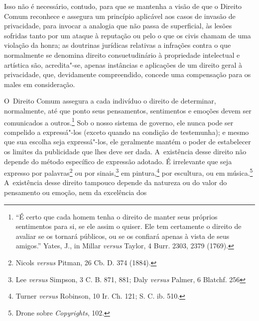 Isso não é necessário, contudo, para que se mantenha a visão de que o
Direito Comum reconhece e assegura um princípio aplicável aos casos de
invasão de privacidade, para invocar a analogia que não passa de
superficial, às lesões sofridas tanto por um ataque à reputação ou pelo
o que os civis chamam de uma violação da honra; as doutrinas jurídicas
relativas a infrações contra o que normalmente se denomina direito
consuetudinário à propriedade intelectual e artística são, acredita"-se,
apenas instâncias e aplicações de um direito geral à privacidade, que,
devidamente compreendido, concede uma compensação para os males em
consideração.

O~Direito Comum assegura a cada indivíduo o direito de determinar,
normalmente, até que ponto seus pensamentos, sentimentos e emoções devem
ser comunicados a outros.\footnote{``É certo que cada homem tenha o
  direito de manter seus próprios sentimentos para si, se ele assim o
  quiser. Ele tem certamente o direito de avaliar se os tornará
  públicos, ou se os confiará apenas à vista de seus amigos.'' Yates,
  J., in Millar \emph{versus} Taylor, 4 Burr. 2303, 2379 (1769).} Sob o
nosso sistema de governo, ele nunca pode ser compelido a expressá"-los
(exceto quando na condição de testemunha); e mesmo que sua escolha seja
expressá"-los, ele geralmente mantém o poder de estabelecer os limites da
publicidade que lhes deve ser dada. A~existência desse direito não
depende do método específico de expressão adotado. É irrelevante que
seja expresso por palavras\footnote{Nicols \emph{versus} Pitman, 26 Cb.
  D. 374 (1884).} ou por sinais,\footnote{Lee \emph{versus} Simpson, 3
  C. B. 871, 881; Daly \emph{versus} Palmer, 6 Blatchf. 256} em
pintura,\footnote{Turner \emph{versus} Robinson, 10 Ir. Ch. 121; S. C.
  ib. 510.} por escultura, ou em música.\footnote{Drone sobre
  \emph{Copyrights}, 102.} A~existência desse direito tampouco depende
da natureza ou do valor do pensamento ou emoção, nem da excelência dos
